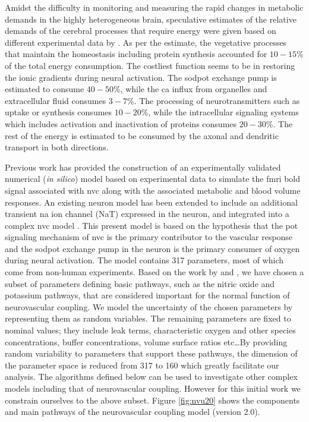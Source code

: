 Amidst the difficulty in monitoring and measuring the rapid changes in metabolic demands in the highly heterogeneous brain, speculative estimates of the relative demands of the cerebral processes that require energy were given based on different experimental data by \citet{Ames2000}. As per the estimate, the vegetative processes that maintain the homeostasis including protein synthesis accounted for $10-15$\% of the total energy consumption. The costliest function seems to be in  restoring the ionic gradients during neural activation. The \gls{sodpot} exchange pump is estimated to consume $40-50$\%, while the \gls{ca} influx from organelles and extracellular fluid consumes $3-7$\%. The processing of neurotransmitters such as uptake or synthesis consumes $10-20$\%, while the intracellular signaling systems which includes activation and inactivation of proteins consumes $20-30$\%. The rest of the energy is estimated to be consumed by the axonal and dendritic transport in both directions.

Previous work \cite{Mathias2018} has provided  the construction of an experimentally validated numerical (\textit{in silico}) model based on experimental data to simulate the \gls{fmri} \gls{bold} signal associated with \gls{nvc} along with the associated metabolic and blood volume responses. An existing neuron model \citep{Mathias2017, Mathias2017a} has been extended to include an additional transient \gls{na} ion channel (NaT) expressed in the neuron, and integrated into a complex \gls{nvc} model \citep{Dormanns2015, Dormanns2016, Kenny2017a}. This present model is based on the hypothesis that the \gls{pot} signaling mechanism of \gls{nvc} is the primary contributor to the vascular response and the \gls{sodpot} exchange pump in the neuron is the primary consumer of oxygen during neural activation. The model contains 317 parameters, most of which come from non-human experiments. Based on the work by \cite{Dormanns2016} and \cite{Kenny2018}, we have chosen a subset of parameters defining basic pathways, such as  the nitric oxide and potassium pathways,   that are considered important for the normal function of neurovascular coupling.  We model the uncertainty of the chosen parameters  by representing them as random variables. The remaining  parameters are fixed to nominal values; they include leak terms, characteristic oxygen and other species concentrations, buffer concentrations, volume surface ratios etc\dots By providing random variability to parameters that support these pathways, the dimension of the parameter space is reduced from 317 to 160 which greatly facilitate our analysis. The algorithms defined below can be used to investigate other complex models including that of neurovascular coupling. However for this initial work we constrain ourselves to the above subset. 
Figure \ref{fig:nvu20} shows the components and main pathways of the neurovascular coupling model (version 2.0). \\


